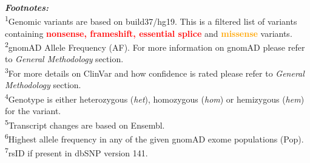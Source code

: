 \\ \\ \\
\textbf{\textit{Footnotes:}}
\\
\textsuperscript{1}Genomic variants are based on build37/hg19. This is a filtered list of variants containing \textcolor{red}{\textbf{nonsense, frameshift, essential splice}} and \textcolor{Orange}{\textbf{missense}} variants.
\\
\textsuperscript{2}gnomAD Allele Frequency (AF). For more information on gnomAD please refer to \textit{General Methodology} section.
\\
\textsuperscript{3}For more details on ClinVar and how confidence is rated please refer to \textit{General Methodology} section.
\\
\textsuperscript{4}Genotype is either heterozygous (\textit{het}), homozygous (\textit{hom}) or hemizygous (\textit{hem}) for the variant.
\\
\textsuperscript{5}Transcript changes are based on Ensembl.
\\
\textsuperscript{6}Highest allele frequency in any of the given gnomAD exome populations (Pop).
\\
\textsuperscript{7}rsID if present in dbSNP version 141.
\\
\newpage
